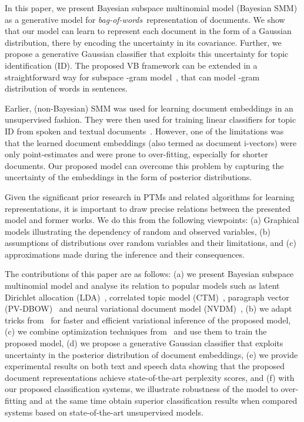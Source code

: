 \documentclass[journal]{IEEEtran}
\newcommand{\bow}{\textit{bag-of-words}}
\newcommand{\baysmm}{Bayesian SMM}
\begin{document}
In this paper, we present Bayesian subspace multinomial model (\baysmm) as a
generative model for \bow~representation of documents. We show that our model
can learn to represent each document in the form of a Gaussian 
distribution, there by encoding the uncertainty in its covariance. 
Further, we propose a generative Gaussian classifier that exploits this 
uncertainty for topic identification (ID). The proposed VB framework can be 
extended in a straightforward way for subspace -gram 
model~\cite{Mehdi:2013:SnGM}, that can model -gram distribution of words 
in sentences.

Earlier, (non-Bayesian) SMM was used for learning document embeddings in an
unsupervised fashion. They were then used for training linear classifiers for  
topic ID from spoken and textual 
documents~\cite{May:2015:mivec,Kesiraju:2016:SMM}.
However, one of the limitations was that the learned document embeddings
(also termed as document i-vectors) were only point-estimates and
were prone to over-fitting, especially for shorter documents.
Our proposed model can overcome this problem by capturing the uncertainty of
the embeddings in the form of posterior distributions.



Given the significant prior research in PTMs and related algorithms for 
learning representations, it is important to draw precise relations between the 
presented model and former works. We do this from the following viewpoints: (a) 
Graphical models illustrating the dependency of random and observed variables, 
(b) assumptions of distributions over random variables and their limitations, 
and (c) approximations made during the inference and their consequences.

The contributions of this paper are as follows: (a) we present Bayesian
subspace multinomial model and analyse its relation to popular models such
as latent Dirichlet allocation (LDA)~\cite{Blei:2003:LDA}, correlated topic
model (CTM)~\cite{Blei:2005:CTM}, paragraph vector 
(PV-DBOW)~\cite{Quoc:2014:PV} and neural variational document model 
(NVDM)~\cite{NVI:2016}, (b) we adapt tricks from~\cite{Kingma:2014:AEVB} for 
faster and efficient variational inference of the proposed model, (c) we 
combine optimization techniques from~\cite{Kingma:2014:Adam,Andrew:2007:L1} and 
use them to train the proposed model, (d) we propose a generative Gaussian 
classifier that exploits uncertainty in the posterior distribution of document 
embeddings, (e) we provide experimental results on both text and speech data 
showing that the proposed document representations achieve state-of-the-art 
perplexity scores, and (f) with our proposed classification systems, we 
illustrate robustness of the model to over-fitting and at the same time obtain 
superior classification results when compared systems based on state-of-the-art 
unsupervised models.
\end{document}
